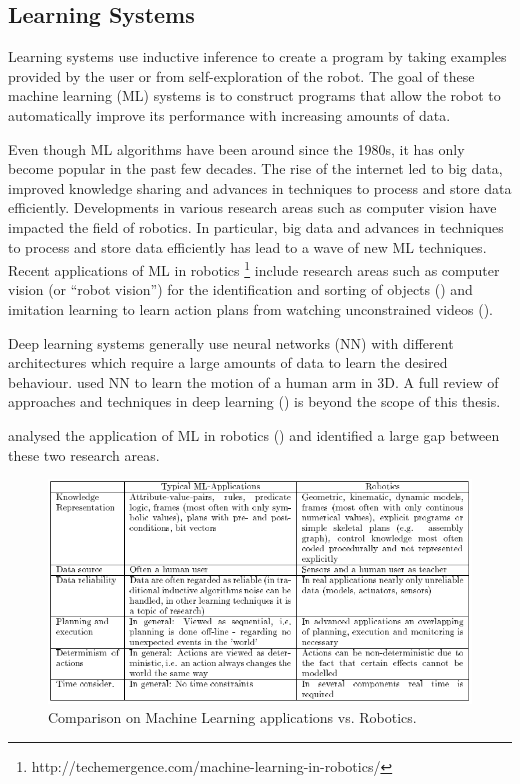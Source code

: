 \subsection{Learning Systems}\label{sssec:Learning Systems}
Learning systems use inductive inference to create a program by taking examples provided by the user or from self-exploration of the robot. 
The goal of these machine learning (ML) systems is to construct programs that allow the robot to automatically improve its performance with increasing amounts of data. 

Even though ML algorithms have been around since the 1980s, it has only become popular in the past few decades. 
The rise of the internet led to big data, improved knowledge sharing and advances in techniques to process and store data efficiently.
Developments in various research areas such as computer vision have impacted the field of robotics.
In particular, big data and advances in techniques to process and store data efficiently has lead to a wave of new ML techniques. 
Recent applications of ML in robotics \footnote{http://techemergence.com/machine-learning-in-robotics/} include research areas such as computer vision (or ``robot vision'') for the identification and sorting of objects (\cite{stager2013computer}) and imitation learning to learn action plans from watching unconstrained videos (\cite{Yang2015}).

Deep learning systems generally use neural networks (NN) with different architectures which require a large amounts of data to learn the desired behaviour.
\cite{billard2001robust} used NN to learn the motion of a human arm in 3D.
A full review of approaches and techniques in deep learning (\cite{schmidhuber2015deep}) is beyond the scope of this thesis.

\cite{Kreuziger1992} analysed the application of ML in robotics () and identified a large gap between these two research areas.
\begin{figure}[h]
	\centering
	\includegraphics[width=\linewidth]{figures/Kreuziger1992-Comparison ML Robotics}
	\caption{Comparison on Machine Learning applications vs. Robotics. \cite{Kreuziger1992}}
	\label{fig:MLvsRobotics}
\end{figure} 

